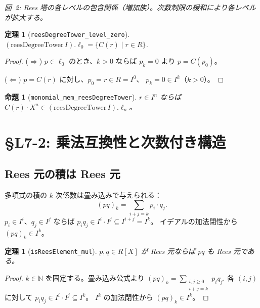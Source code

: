 \documentclass[a4paper,12pt]{article}
\theoremstyle{definition}
\theoremstyle{plain}
\newtheorem{theorem}[definition]{定理}
\newtheorem{proposition}[definition]{命題}
\newcommand{\figcap}[1]{\begin{center}\small\textit{#1}\end{center}}
\newcommand{\Ipower}[1]{I^{#1}}
\newcommand{\reesdeg}{\mathrm{reesDegreeTower}}
\newcommand{\lev}[1]{\ell_{#1}}
\begin{document}
\begin{center}
\end{center}
\figcap{図~2: Rees 塔の各レベルの包含関係（増加族）。次数制限の緩和により各レベルが拡大する。}

\begin{theorem}[\texttt{reesDegreeTower\_level\_zero}]
$(\reesdeg\,I).\lev{0} = \{ C(r) \mid r \in R \}$.
\end{theorem}
\begin{proof}
($\Rightarrow$) $p \in \lev{0}$ のとき、$k > 0$ ならば $p_k = 0$ より $p = C(p_0)$。

\noindent($\Leftarrow$) $p = C(r)$ に対し、$p_0 = r \in R = \Ipower{0}$、
$p_k = 0 \in \Ipower{k}$（$k > 0$）。
\end{proof}

\begin{proposition}[\texttt{monomial\_mem\_reesDegreeTower}]
$r \in \Ipower{n}$ ならば $C(r) \cdot X^n \in (\reesdeg\,I).\lev{n}$。
\end{proposition}

\section{\S{}L7-2: 乗法互換性と次数付き構造}

\subsection{Rees 元の積は Rees 元}

\begin{insightbox}
多項式の積の $k$ 次係数は畳み込みで与えられる：
\[
  (pq)_k = \sum_{i+j=k} p_i \cdot q_j.
\]
$p_i \in \Ipower{i}$、$q_j \in \Ipower{j}$ ならば
$p_i q_j \in \Ipower{i} \cdot \Ipower{j} \subseteq \Ipower{i+j} = \Ipower{k}$。
イデアルの加法閉性から $(pq)_k \in \Ipower{k}$。
\end{insightbox}

\begin{theorem}[\texttt{isReesElement\_mul}]
$p, q \in R[X]$ が Rees 元ならば $pq$ も Rees 元である。
\end{theorem}
\begin{proof}
$k \in \mathbb{N}$ を固定する。畳み込み公式より
$\displaystyle(pq)_k = \sum_{\substack{i,j \geq 0 \\ i+j=k}} p_i q_j$.
各 $(i,j)$ に対して $p_i q_j \in \Ipower{i} \cdot \Ipower{j} \subseteq \Ipower{k}$。
$\Ipower{k}$ の加法閉性から $(pq)_k \in \Ipower{k}$。
\end{proof}
\end{document}
